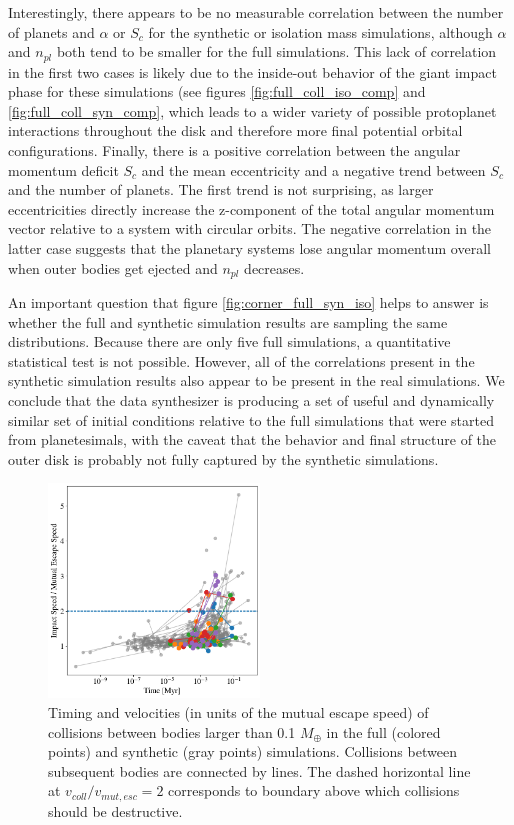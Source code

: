 Interestingly, there appears to be no measurable correlation between the number of planets and $\alpha$ or $S_{c}$ for the synthetic or isolation mass simulations, although $\alpha$ and $n_{pl}$ both tend to be smaller for the full simulations. This lack of correlation in the first two cases is likely due to the inside-out behavior of the giant impact phase for these simulations (see figures \ref{fig:full_coll_iso_comp} and \ref{fig:full_coll_syn_comp}, which leads to a wider variety of possible protoplanet interactions throughout the disk and therefore more final potential orbital configurations. Finally, there is a positive correlation between the angular momentum deficit $S_{c}$ and the mean eccentricity and a negative trend between $S_{c}$ and the number of planets. The first trend is not surprising, as larger eccentricities directly increase the z-component of the total angular momentum vector relative to a system with circular orbits. The negative correlation in the latter case suggests that the planetary systems lose angular momentum overall when outer bodies get ejected and $n_{pl}$ decreases.

An important question that figure  \ref{fig:corner_full_syn_iso} helps to answer is whether the full and synthetic simulation results are sampling the same distributions. Because there are only five full simulations, a quantitative statistical test is not possible. However, all of the correlations present in the synthetic simulation results also appear to be present in the real simulations. We conclude that the data synthesizer is producing a set of useful and dynamically similar set of initial conditions relative to the full simulations that were started from planetesimals, with the caveat that the behavior and final structure of the outer disk is probably not fully captured by the synthetic simulations.

\begin{figure}
\begin{center}
    \includegraphics[width=0.5\textwidth]{figures/stip/impact_syn_comp.png}
    \caption{Timing and velocities (in units of the mutual escape speed) of collisions between bodies larger than 0.1 $M_{\oplus}$ in the full (colored points) and synthetic (gray points) simulations. Collisions between subsequent bodies are connected by lines. The dashed horizontal line at $v_{coll}/v_{mut,esc} = 2$ corresponds to boundary above which collisions should be destructive.\label{fig:impact_syn_comp}}
\end{center}
\end{figure}

